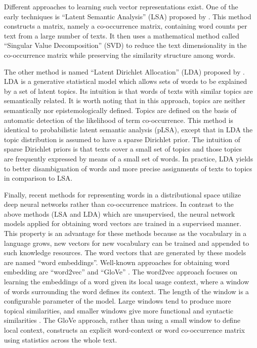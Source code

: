 Different approaches to learning such vector representations exist.  
One of the early techniques is ``Latent Semantic Analysis'' (LSA) proposed by . 
This method constructs a matrix, namely a co-occurrence matrix, containing word counts per text from a large number of texts.   
It then uses a mathematical method called ``Singular Value Decomposition'' (SVD) \cite{furnas88} to reduce the text dimensionality in the co-occurrence matrix while preserving the similarity structure among words. 

The other method is named ``Latent Dirichlet Allocation'' (LDA) proposed by . 
LDA is a generative statistical model which allows sets of words to be explained by a set of latent topics.  
Its intuition is that words of texts with similar topics are semantically related. 
It is worth noting that in this approach, topics are neither semantically nor epistemologically defined. 
Topics are defined on the basis of automatic detection of the likelihood of term co-occurrence. 
This method is identical to probabilistic latent semantic analysis (pLSA), except that in LDA the topic distribution is assumed to have a sparse Dirichlet prior.
The intuition of sparse Dirichlet priors is that texts cover a small set of topics and those topics are frequently expressed by means of a small set of words. 
In practice, LDA yields to better disambiguation of words and more precise assignments of texts to topics in comparison to LSA. 

Finally, recent methods for representing words in a distributional space utilize deep neural networks rather than co-occurrence matrices. 
In contrast to the above methods (LSA and LDA) which are unsupervised, the neural network models applied for obtaining word vectors are trained in a supervised manner.  This property is an advantage for these methods because as the vocabulary in a language grows, new vectors for new vocabulary can be trained and appended to such knowledge resources.  
The word vectors that are generated by these models are named ``word embeddings''. 
Well-known approaches for obtaining word embedding are ``word2vec''  \cite{mikolov13} and ``GloVe'' \cite{pennington14}. 
The word2vec approach focuses on learning the embeddings of a word given its local usage context, where a window of words surrounding the word defines its context. 
The length of the window is a configurable parameter of the model. 
Large windows tend to produce more topical similarities, and smaller windows give more functional and syntactic similarities \cite{goldberg17}. 
The GloVe approach, rather than using a small window to define local context,  constructs an explicit word-context or word co-occurrence matrix using statistics across the whole text. 

